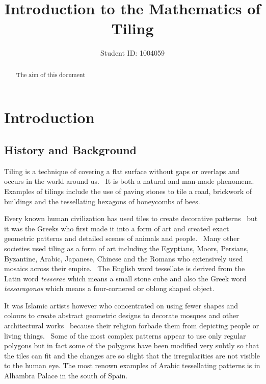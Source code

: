 \documentclass[a4paper,12pt,twoside,abstraction,titlepage]{article}
\title{\Large \bf Introduction to the Mathematics of Tiling}
\author{Student ID: 1004059}
\theoremstyle{remark}
\theoremstyle{definition}
\begin{document}
\maketitle

\begin{abstract}
The aim of this document
\end{abstract}

\clearpage
\setcounter{tocdepth}{2}
\tableofcontents

\newpage
\listoffigures
 
\newpage

\section{Introduction}
\subsection{History and Background}
Tiling is a technique of covering a flat surface without gaps or overlaps and occurs in the world around us.~\cite{scienceu} It is both a natural and man-made phenomena. Examples of tilings include the use of paving stones to tile a road, brickwork of buildings and the tessellating hexagons of honeycombs of bees.

Every known human civilization has used tiles to create decorative patterns~\cite[\S I]{branko} but it was the Greeks who first made it into a form of art and created exact geometric patterns and detailed scenes of animals and people.~\cite{mosaics}  Many other societies used tiling as a form of art including the Egyptians, Moors, Persians, Byzantine, Arabic, Japanese, Chinese and the Romans who extensively used mosaics across their empire.~\cite{totally} The English word tessellate is derived from the Latin word \emph{tesserae} which means a small stone cube and also the Greek word \emph{tessaragonos} which means a four-cornered or oblong shaped object.~\cite{wordquests}

It was Islamic artists however who concentrated on using fewer shapes and colours to create abstract geometric designs to decorate mosques and other architectural works~\cite[\S I]{branko} because their religion forbade them from depicting people or living things.~\cite{totally} Some of the most complex patterns appear to use only regular polygons but in fact some of the polygons have been modified very subtly so that the tiles can fit and the changes are so slight that the irregularities are not visible to the human eye. The most renown examples of Arabic tessellating patterns is in Alhambra Palace in the south of Spain.~\cite{totally}
\end{document}
